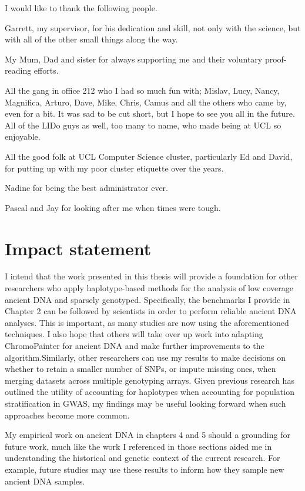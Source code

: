 \begin{acknowledgements}
\noindent
I would like to thank the following people.

\noindent
Garrett, my supervisor, for his dedication and skill, not only with the science, but with all of the other small things along the way. 

\noindent
My Mum, Dad and sister for always supporting me and their voluntary proof-reading efforts.

\noindent
All the gang in office 212 who I had so much fun with; Mislav, Lucy, Nancy, Magnifica, Arturo, Dave, Mike, Chris, Camus and all the others who came by, even for a bit. It was sad to be cut short, but I hope to see you all in the future. All of the LIDo guys as well, too many to name, who made being at UCL so enjoyable. 


\noindent
All the good folk at UCL Computer Science cluster, particularly Ed and David, for putting up with my poor cluster etiquette over the years. 

\noindent
Nadine for being the best administrator ever.

\noindent
Pascal and Jay for looking after me when times were tough. 
\end{acknowledgements}


\section{Impact statement}

I intend that the work presented in this thesis will provide a foundation for other researchers who apply haplotype-based methods for the analysis of low coverage ancient DNA and sparsely genotyped. Specifically, the benchmarks I provide in Chapter 2 can be followed by scientists in order to perform reliable ancient DNA analyses. This is important, as many studies are now using the aforementioned techniques. I also hope that others will take over up work into adapting ChromoPainter for ancient DNA and make further improvements to the algorithm.Similarly, other researchers can use my results to make decisions on whether to retain a smaller number of SNPs, or impute missing ones, when merging datasets across multiple genotyping arrays. Given previous research has outlined the utility of accounting for haplotypes when accounting for population stratification in GWAS, my findings may be useful looking forward when such approaches become more common. 

My empirical work on ancient DNA in chapters 4 and 5 should a grounding for future work, much like the work I referenced in those sections aided me in understanding the historical and genetic context of the current research. For example, future studies may use these results to inform how they sample new ancient DNA samples. 

